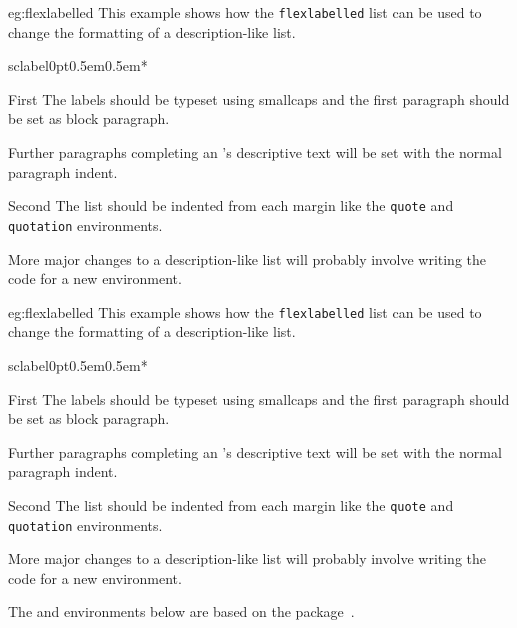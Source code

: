 \begin{egsource}{eg:flexlabelled}
This example shows how the \texttt{flexlabelled} list can be used to
change the formatting of a description-like list.
\newcommand*{\sclabel}[1]{\normalfont\scshape #1}
\begin{flexlabelled}{sclabel}{0pt}{0.5em}{0.5em}{*}{\leftmargin}
\item[First] The labels should be typeset using smallcaps and the first
             paragraph should be set as block paragraph.

             Further paragraphs completing an 's descriptive text
             will be set with the normal paragraph indent.
\item[Second] The list should be indented from each margin like the
              \texttt{quote} and \texttt{quotation} environments.
\end{flexlabelled}
More major changes to a description-like list will probably involve writing 
the code for a new environment. 
\end{egsource}

\begin{egresult}{eg:flexlabelled}
This example shows how the \texttt{flexlabelled} list can be used to
change the formatting of a description-like list.
\newcommand*{\sclabel}[1]{\normalfont\scshape #1}
\begin{flexlabelled}{sclabel}{0pt}{0.5em}{0.5em}{*}{\leftmargin}
\item[First] The labels should be typeset using smallcaps and the first
             paragraph should be set as block paragraph.

             Further paragraphs completing an 's descriptive text
             will be set with the normal paragraph indent.
\item[Second] The list should be indented from each margin like the
              \texttt{quote} and \texttt{quotation} environments.
\end{flexlabelled}
More major changes to a description-like list will probably involve writing 
the code for a new environment. 
\end{egresult}



    The  and  environments below are based on
the  package~\cite{ENUMERATE}.


